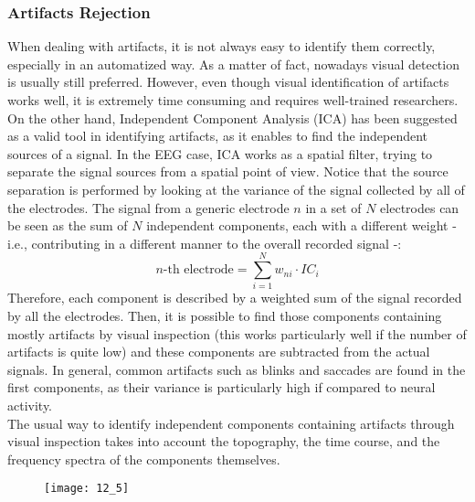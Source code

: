 \subsubsection{Artifacts Rejection}
When dealing with artifacts, it is not always easy to identify them correctly, especially in
an automatized way. As a matter of fact, nowadays visual detection is usually still preferred.
However, even though visual identification of artifacts works well, it is extremely time
consuming and requires well-trained researchers.\\
On the other hand, Independent Component Analysis (ICA) has
been suggested as a valid tool in identifying artifacts, as it enables to find the
independent sources of a signal. In the EEG case, ICA works as a spatial filter, trying to
separate the signal sources from a spatial point of view. Notice that the source separation
is performed by looking at the variance of the signal collected by all of the electrodes.
The signal from a generic electrode \(n\) in a set of \(N\) electrodes can be seen as the
sum of \(N\) independent components, each with a different weight - i.e., contributing in a
different manner to the overall recorded signal -:
\begin{equation*}
    n\text{-th electrode} = \sum_{i=1}^N w_{ni}\cdot{IC_i}
\end{equation*}
Therefore, each component is described by a weighted sum of the signal recorded by all the
electrodes. Then, it is possible to find those components containing mostly artifacts by visual
inspection (this works particularly well if the number of artifacts is quite low) and these
components are subtracted from the actual signals. In general, common artifacts such as blinks
and saccades are found in the first components, as their variance is particularly high if
compared to neural activity.\\
The usual way to identify independent components containing artifacts through visual inspection
takes into account the topography, the time course, and the frequency spectra of the
components themselves.
\begin{figure}[H]
    \centering
    \texttt{[image: 12\_5]}
\end{figure}
